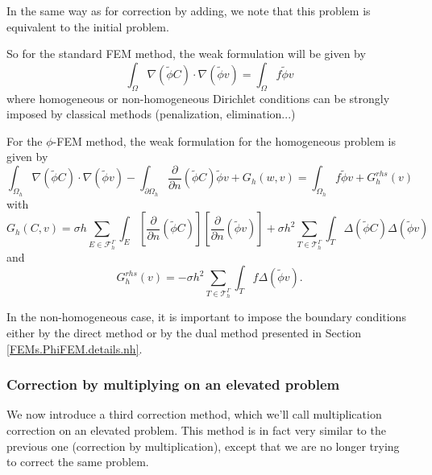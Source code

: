 \begin{Rem}
	In the same way as for correction by adding, we note that this problem is equivalent to the initial problem.
\end{Rem}

So for the standard FEM method, the weak formulation will be given by
\begin{equation*}
	\int_\Omega \nabla (\tilde{\phi}C)\cdot\nabla (\tilde{\phi}v)=\int_\Omega f\tilde{\phi}v
\end{equation*}
where homogeneous or non-homogeneous Dirichlet conditions can be strongly imposed by classical methods (penalization, elimination...)

For the $\phi$-FEM method, the weak formulation for the homogeneous problem is given by
\begin{equation*}
	\int_{\Omega_h} \nabla (\tilde{\phi} C) \cdot \nabla (\tilde{\phi} v) - \int_{\partial\Omega_h} \frac{\partial}{\partial n}(\tilde{\phi} C)\tilde{\phi} v+G_h(w,v)=\int_{\Omega_h} f \tilde{\phi} v + G_h^{rhs}(v)
\end{equation*}
with
\begin{equation*}
	G_h(C,v)=\sigma h\sum_{E\in\mathcal{F}_h^\Gamma} \int_E \left[\frac{\partial}{\partial n}(\tilde{\phi} C)\right] \left[\frac{\partial}{\partial n}(\tilde{\phi} v)\right]+\sigma h^2\sum_{T\in\mathcal{T}_h^\Gamma} \int_{T} \Delta(\tilde{\phi} C)\Delta(\tilde{\phi} v)
\end{equation*}
and
\begin{equation*}
	G_h^{rhs}(v)=-\sigma h^2\sum_{T\in\mathcal{T}_h^\Gamma} \int_{T} f \Delta(\tilde{\phi} v).
\end{equation*}

In the non-homogeneous case, it is important to impose the boundary conditions either by the direct method or by the dual method presented in Section \ref{FEMs.PhiFEM.details.nh}.


\subsubsection{Correction by multiplying on an elevated problem} \label{Corr.method.mult_reh}

We now introduce a third correction method, which we'll call multiplication correction on an elevated problem. This method is in fact very similar to the previous one (correction by multiplication), except that we are no longer trying to correct the same problem.

